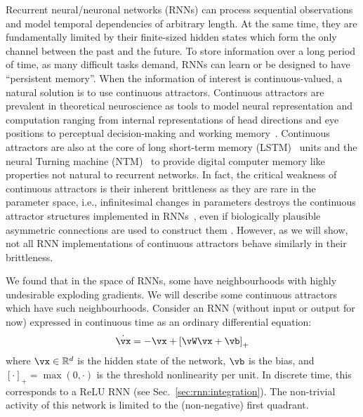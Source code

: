 \documentclass{article} %
\newcounter{ct}
\newcommand{\reals}{\mathbb{R}}
\theoremstyle{definition}
\theoremstyle{remark}
\renewcommand{\cite}{\citep}
\begin{document}
Recurrent neural/neuronal networks (RNNs) can process sequential observations and model temporal dependencies of arbitrary length.
At the same time, they are fundamentally limited by their finite-sized hidden states which form the only channel between the past and the future.
To store information over a long period of time, as many difficult tasks demand, RNNs can learn or be designed to have ``persistent memory''.
When the information of interest is continuous-valued, a natural solution is to use continuous attractors.
Continuous attractors are prevalent in theoretical neuroscience as tools to model neural representation and computation ranging from internal representations of head directions and eye positions to perceptual decision-making and working memory~\cite{Khona2022}.
Continuous attractors are also at the core of long short-term memory (LSTM)~\cite{Greff2017} units and the neural Turning machine (NTM)~\cite{Graves2014} to provide digital computer memory like properties not natural to recurrent networks. %
In fact, the critical weakness of continuous attractors is their inherent brittleness as they are rare in the parameter space, i.e., infinitesimal changes in parameters destroys the continuous attractor structures implemented in RNNs~\cite{seung1996,Renart2003}, even if biologically plausible asymmetric connections are used to construct them \citep{darshan2022}.
However, as we will show, not all RNN implementations of continuous attractors behave similarly in their brittleness.

We found that in the space of RNNs, some have neighbourhoods with highly undesirable exploding gradients. We will describe some continuous attractors which have such neighbourhoods.
Consider an RNN (without input or output for now) expressed in continuous time as an ordinary differential equation:
\begin{align}\label{eq:TLN}
    \dot{\vx} = -\vx + \left[ \vW \vx + \vb \right]_{+}
\end{align}
where $\vx \in \reals^d$ is the hidden state of the network, $\vb$ is the bias, and $[\cdot]_{+} = \max(0,\cdot)$ is the threshold nonlinearity per unit.
In discrete time, this corresponds to a ReLU RNN (see Sec.~\ref{sec:rnn:integration}).
The non-trivial activity of this network is limited to the (non-negative) first quadrant.
\end{document}
